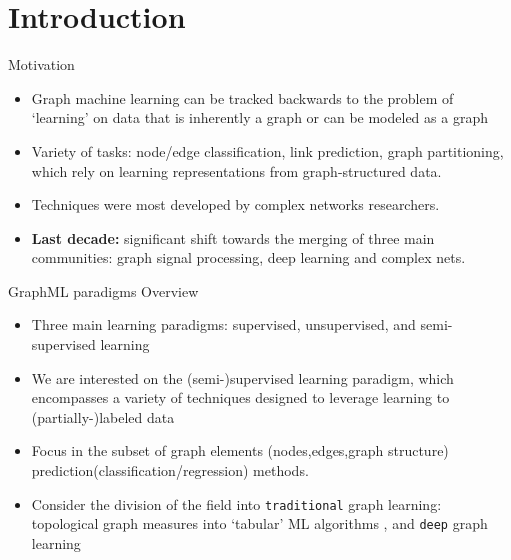 \section{Introduction}

\begin{frame}{Motivation}
\begin{itemize}
    \item Graph machine learning can be tracked backwards to the problem of `learning' on data that is inherently a graph \cite{silva2016machine, JMLR:Perozzi} or can be modeled as a graph \cite{verri2013,grape2020}
    \item Variety of tasks:  node/edge classification, link prediction, graph partitioning, which rely on learning representations from graph-structured data.
    \item  Techniques were most developed by complex networks researchers.
    \item \textbf{Last decade:} significant shift towards the merging of three main communities: graph signal processing, deep learning and complex nets.

\end{itemize}
\end{frame}


\begin{frame}{GraphML paradigms Overview}
    \begin{itemize}
        \item Three main learning paradigms: supervised, unsupervised, and semi-supervised learning
        \item We are interested on the (semi-)supervised learning paradigm, which encompasses a variety of techniques designed to leverage learning to (partially-)labeled data \cite{verri2018advantages,amanciof}
        \item  Focus in the subset of graph elements (nodes,edges,graph structure) prediction(classification/regression) methods.
        \item Consider the division of the field into \texttt{traditional} graph learning: topological graph measures into `tabular' ML algorithms  \cite{costa2007characterization, silva2016machine}, and \texttt{deep} graph learning
    \end{itemize}
\end{frame}

